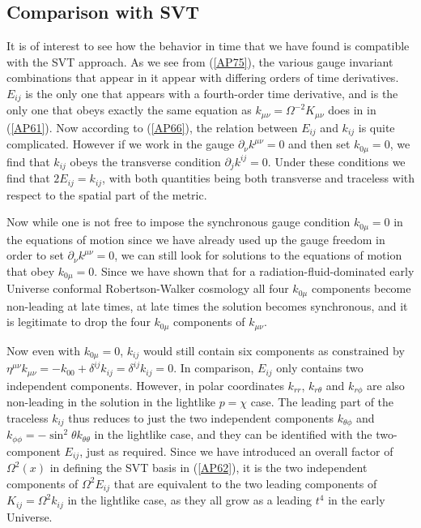 \documentclass[aps]{revtex4}
\begin{document}
\subsection{Comparison with SVT}

It is of interest to see how the behavior in time that we have found  is compatible with the SVT approach. As we see from (\ref{AP75}), the various gauge invariant combinations that appear in it appear with differing orders of time derivatives. $E_{ij}$ is the only one that appears with a fourth-order time derivative, and is the only one that obeys exactly the same equation as $k_{\mu\nu}=\Omega^{-2}K_{\mu\nu}$ does in in (\ref{AP61}). Now according to (\ref{AP66}), the relation between $E_{ij}$ and $k_{ij}$ is quite complicated. However if we work in the gauge $\partial_{\nu}k^{\mu\nu}=0$ and then set $k_{0 \mu}=0$, we find that  $k_{ij}$ obeys the transverse condition $\partial_{j}k^{ij}=0$. Under these conditions we find that $2E_{ij}=k_{ij}$, with both quantities being both transverse and traceless with respect to the spatial part of the metric.  

Now while one is not free to impose  the synchronous gauge condition $k_{0\mu}=0$ in the equations of motion since we have already used up the gauge freedom in  order to set  $\partial_{\nu}k^{\mu\nu}=0$, we can still look for solutions to the equations of motion that obey $k_{0\mu}=0$. Since we have shown that for a radiation-fluid-dominated  early Universe conformal Robertson-Walker cosmology all four  $k_{0\mu}$ components become non-leading at late times, at late times the solution becomes synchronous, and it is legitimate to drop the four $k_{0\mu}$ components of $k_{\mu\nu}$.

Now even with $k_{0\mu}=0$, $k_{ij}$ would still contain six components as constrained by $\eta^{\mu\nu}k_{\mu\nu}=-k_{00}+\delta^{ij}k_{ij}=\delta^{ij}k_{ij}=0$. In comparison, $E_{ij}$ only contains two independent components. However, in polar coordinates $k_{rr}$, $k_{r\theta}$ and $k_{r\phi}$ are also non-leading in the solution in the lightlike $p=\chi$ case. The leading part of the traceless $k_{ij}$ thus reduces to just the two independent components $k_{\theta\phi}$ and $k_{\phi\phi}=-\sin^2\theta k_{\theta\theta}$ in the lightlike case, and they can be identified with the two-component $E_{ij}$, just as required. Since we have introduced an overall factor of $\Omega^2(x)$ in defining the SVT basis in (\ref{AP62}), it is the two independent components  of $\Omega^2E_{ij}$ that are equivalent to the two leading components of $K_{ij}=\Omega^2k_{ij}$ in the lightlike case, as they all grow as a leading $t^4$ in the early Universe.
\end{document}
